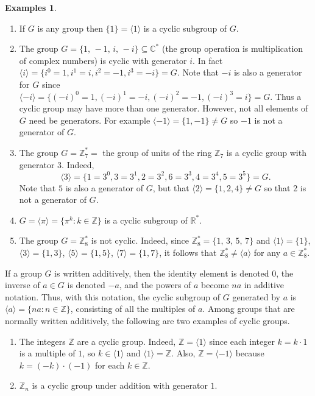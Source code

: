 \documentclass[11pt]{article}
\newcommand{\R}{\mathbb R}
\newcommand{\cm} {{\mathbb C}}
\newcommand{\Z} {{\mathbb Z}}
\theoremstyle{plain}
\theoremstyle{definition}
\newtheorem{exs}[thm]{Examples}
\begin{document}
\begin{exs}  \begin{enumerate}
\item If $G$ is any group  then
$\{1\} =\langle 1\rangle$ is a cyclic subgroup of $G$.

\item  The group $G=\{1,\, -1,\, i,\, -i\} \subseteq \cm^*$ (the
group operation  is multiplication of complex numbers) is cyclic
with generator $i$.  In fact $\langle i\rangle = \{i^0=1, i^1=i,
i^2=-1, i^3=-i\} = G$.  Note that $-i$ is also a generator for $G$
since $\langle -i\rangle =\{(-i)^0=1, (-i)^1=-i, (-i)^2=-1,
(-i)^3=i\}=G$.  Thus a cyclic group may have more than one
generator.  However, not all elements of $G$ need be generators.
For example $\langle -1\rangle = \{1, -1\}\ne G$ so $-1$ is not a
generator of $G$.

\item The group $G=\Z_7^*=$ the group of units of the ring $\Z_7$ is
a cyclic group with generator $3$.  Indeed,
$$\langle 3\rangle = \{ 1=3^0, 3=3^1, 2=3^2, 6=3^3, 4=3^4, 5=3^5\}=G.$$
Note that $5$ is also a generator of $G$, but that
$\langle 2\rangle = \{1, 2, 4\}\ne G$ so that 2 is not a generator of $G$.

\item  $G=\langle \pi\rangle =\{\pi^k:k\in \Z\}$ is a cyclic
subgroup of $\R^*$.

\item  The group $G=\Z_8^*$ is not cyclic.  Indeed, since
$\Z_8^*=\{1, \, 3,\, 5,\,7\}$ and $\langle 1\rangle = \{1\}$,
$\langle 3\rangle = \{1, 3\}$, $\langle 5\rangle=\{1, 5\}$,
$\langle 7\rangle =\{1, 7\}$, it follows that $\Z_8^*\ne \langle
a\rangle$ for any $a\in \Z_8^*$.
\end{enumerate}
\medskip
If a group $G$ is written additively, then the identity
element is denoted $0$,   the inverse of $a\in G$ is denoted $-a$,
and the powers of $a$ become $na$ in additive notation.  Thus,
with this notation, the cyclic subgroup of $G$ generated by $a$ is
$\langle a \rangle = \{na: n\in \Z\}$, consisting of all the
multiples of $a$. Among groups that are normally written
additively, the following are two examples of cyclic groups.
\begin{enumerate}
\addtocounter{enumi}{5} \item  The integers $\Z$ are a cyclic
group. Indeed, $\Z=\langle 1\rangle$ since each integer $k=k\cdot
1$ is a multiple of $1$, so $k\in \langle 1\rangle$ and $\langle
1\rangle =\Z$.  Also, $\Z=\langle -1\rangle$ because $k=(-k)\cdot
(-1)$ for each $k\in \Z$.

\item  $\Z_n$ is a cyclic group under addition with generator $1$.
\end{enumerate}
\end{exs}
\end{document}
